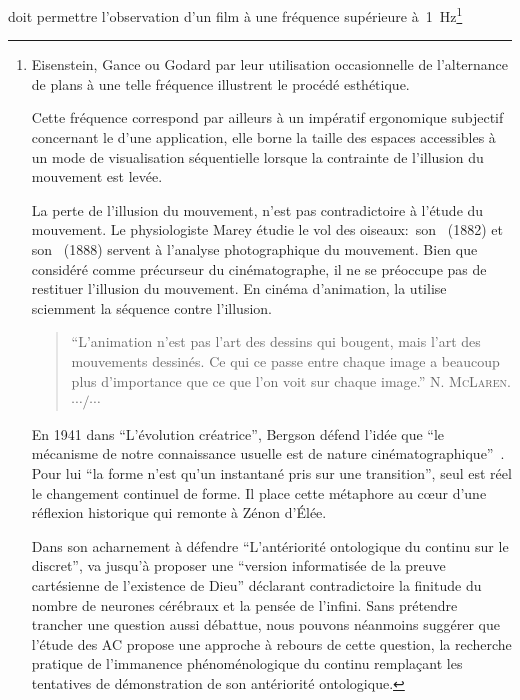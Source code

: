 doit permettre l'observation d'un film à une fréquence supérieure
à~1~Hz\footnote{%
  Eisenstein, Gance ou Godard par leur utilisation occasionnelle de
  l'alternance de plans à une telle fréquence illustrent le procédé
  esthétique. %

  Cette fréquence correspond par ailleurs à un impératif ergonomique
  subjectif concernant le  d'une application,
  elle borne la taille des espaces accessibles à un mode de
  visualisation séquentielle lorsque la contrainte de l'illusion du
  mouvement est levée. %
  
  La perte de l'illusion du mouvement, n'est pas contradictoire à
  l'étude du mouvement. %
  Le physiologiste Marey étudie le vol des oiseaux:~son %
  ~(1882) et son %
  ~(1888) %
  servent à l'analyse photographique du mouvement. %
  Bien que considéré comme précurseur du cinématographe,
  il ne se préoccupe pas de restituer l'illusion du mouvement. %
  En cinéma d'animation, la  utilise sciemment
  la séquence contre l'illusion. %
  \begin{quote}
    ``L'animation n'est pas l'art des dessins qui bougent, mais l'art des
    mouvements dessinés. %
    Ce qui ce passe entre chaque image a beaucoup plus d'importance que
    ce que l'on voit sur chaque image.'' \textsc{N. McLaren}.{\hfill$\cdots/\cdots$}%
  \end{quote}
  En 1941 dans ``L'évolution créatrice'', Bergson
  défend l'idée que ``le mécanisme de notre connaissance usuelle est
  de nature cinématographique''~\cite[page 305]{Bergson89}. %
  Pour lui ``la forme n'est qu'un instantané pris sur une
  transition'', seul est réel le changement continuel de forme. %
  Il place cette métaphore au cœur d'une réflexion historique qui
  remonte à Zénon d'Élée. %

  Dans son acharnement à défendre ``L'antériorité ontologique du
  continu sur le discret'', \cite{Thom92} va jusqu'à proposer
  une ``version informatisée de la preuve cartésienne de
  l'existence de Dieu'' déclarant contradictoire la finitude du nombre
  de neurones cérébraux et la pensée de l'infini. %
  Sans prétendre trancher une question aussi débattue, nous pouvons
  néanmoins suggérer que l'étude des AC propose une approche à rebours
  de cette question, la recherche pratique de l'immanence
  phénoménologique du continu remplaçant les tentatives de
  démonstration de son antériorité ontologique. %

}
